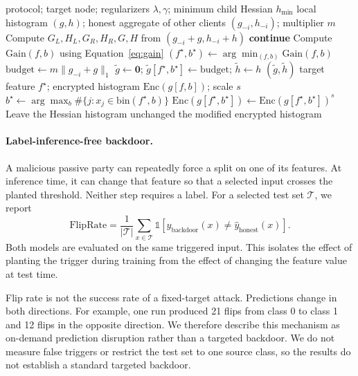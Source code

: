 \documentclass[11pt]{article}
\begin{document}
\begin{algorithm}[htbp]
\caption{Split hijacking in horizontal and vertical protocols}
\label{alg:splithijack}
\begin{algorithmic}[1]
\Require protocol; target node; regularizers $\lambda,\gamma$; minimum child Hessian $h_{\min}$
  \Require local histogram $(g,h)$; honest aggregate of other clients $(g_{-i},h_{-i})$; multiplier $m$
    \State Compute $G_L,H_L,G_R,H_R,G,H$ from $(g_{-i}+g,h_{-i}+h)$
      \State \textbf{continue}
    \EndIf
    \State Compute $\mathrm{Gain}(f,b)$ using Equation~\ref{eq:gain}
  \EndFor
  \State $(f^\star,b^\star)\gets\arg\min_{(f,b)}\mathrm{Gain}(f,b)$
  \State $\mathrm{budget}\gets m\lVert g_{-i}+g\rVert_1$
  \State $\tilde g\gets\mathbf{0}$; $\tilde g[f^\star,b^\star]\gets\mathrm{budget}$; $\tilde h\gets h$
  \State \Return $(\tilde g,\tilde h)$
\Else
  \Require target feature $f^\star$; encrypted histogram $\mathrm{Enc}(g[f,b])$; scale $s$
  \State $b^\star\gets\arg\max_b\#\{j:x_j\in\mathrm{bin}(f^\star,b)\}$
  \State $\mathrm{Enc}(g[f^\star,b^\star])\gets\mathrm{Enc}(g[f^\star,b^\star])^s$
  \State Leave the Hessian histogram unchanged
  \State \Return the modified encrypted histogram
\EndIf
\end{algorithmic}
\end{algorithm}

\paragraph{Label-inference-free backdoor.}
A malicious passive party can repeatedly force a split on one of its features. At inference time, it can change that feature so that a selected input crosses the planted threshold. Neither step requires a label. For a selected test set $\mathcal{T}$, we report
\begin{equation}
\mathrm{FlipRate}
=\frac{1}{\lvert\mathcal{T}\rvert}
\sum_{x\in\mathcal{T}}
\mathbb{1}\left[\hat y_{\mathrm{backdoor}}(x)
\neq\hat y_{\mathrm{honest}}(x)\right].
\label{eq:fliprate}
\end{equation}
Both models are evaluated on the same triggered input. This isolates the effect of planting the trigger during training from the effect of changing the feature value at test time.

Flip rate is not the success rate of a fixed-target attack. Predictions change in both directions. For example, one run produced 21 flips from class 0 to class 1 and 12 flips in the opposite direction. We therefore describe this mechanism as on-demand prediction disruption rather than a targeted backdoor. We do not measure false triggers or restrict the test set to one source class, so the results do not establish a standard targeted backdoor.
\end{document}
